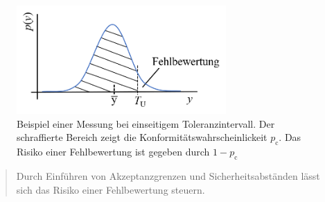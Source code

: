 \begin{figure}[!htp]
	\begin{center}
		\includegraphics[width=80mm]{05_vorlesung/media/Fehlbewertung.png}
		\caption{\label{fig:Produktion_Widerstaende} Beispiel einer Messung bei einseitigem Toleranzintervall. Der schraffierte Bereich zeigt die Konformitätswahrscheinlickeit $p_\mathrm{c}$. Das Risiko einer Fehlbewertung ist gegeben durch $1- p_\mathrm{c}$}
	\end{center}
\end{figure}

\begin{quote}
Durch Einführen von Akzeptanzgrenzen und Sicherheitsabständen lässt sich das Risiko einer Fehlbewertung steuern.
\end{quote}

